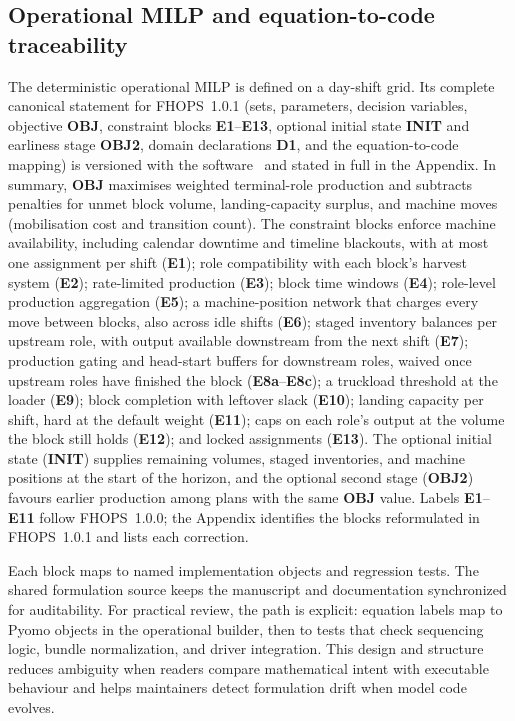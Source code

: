 \subsection{Operational MILP and equation-to-code traceability}
The deterministic operational MILP is defined on a day-shift grid. Its complete canonical statement for FHOPS~1.0.1 (sets, parameters, decision variables, objective \textbf{OBJ}, constraint blocks \textbf{E1}--\textbf{E13}, optional initial state \textbf{INIT} and earliness stage \textbf{OBJ2}, domain declarations \textbf{D1}, and the equation-to-code mapping) is versioned with the software~\cite{fhops2026formulation} and stated in full in the Appendix. In summary, \textbf{OBJ} maximises weighted terminal-role production and subtracts penalties for unmet block volume, landing-capacity surplus, and machine moves (mobilisation cost and transition count). The constraint blocks enforce machine availability, including calendar downtime and timeline blackouts, with at most one assignment per shift (\textbf{E1}); role compatibility with each block's harvest system (\textbf{E2}); rate-limited production (\textbf{E3}); block time windows (\textbf{E4}); role-level production aggregation (\textbf{E5}); a machine-position network that charges every move between blocks, also across idle shifts (\textbf{E6}); staged inventory balances per upstream role, with output available downstream from the next shift (\textbf{E7}); production gating and head-start buffers for downstream roles, waived once upstream roles have finished the block (\textbf{E8a}--\textbf{E8c}); a truckload threshold at the loader (\textbf{E9}); block completion with leftover slack (\textbf{E10}); landing capacity per shift, hard at the default weight (\textbf{E11}); caps on each role's output at the volume the block still holds (\textbf{E12}); and locked assignments (\textbf{E13}). The optional initial state (\textbf{INIT}) supplies remaining volumes, staged inventories, and machine positions at the start of the horizon, and the optional second stage (\textbf{OBJ2}) favours earlier production among plans with the same \textbf{OBJ} value. Labels \textbf{E1}--\textbf{E11} follow FHOPS~1.0.0; the Appendix identifies the blocks reformulated in FHOPS~1.0.1 and lists each correction.

Each block maps to named implementation objects and regression tests. The shared formulation source keeps the manuscript and documentation synchronized for auditability.
For practical review, the path is explicit: equation labels map to Pyomo objects in the operational builder, then to tests that check sequencing logic, bundle normalization, and driver integration. This design and structure reduces ambiguity when readers compare mathematical intent with executable behaviour and helps maintainers detect formulation drift when model code evolves.

